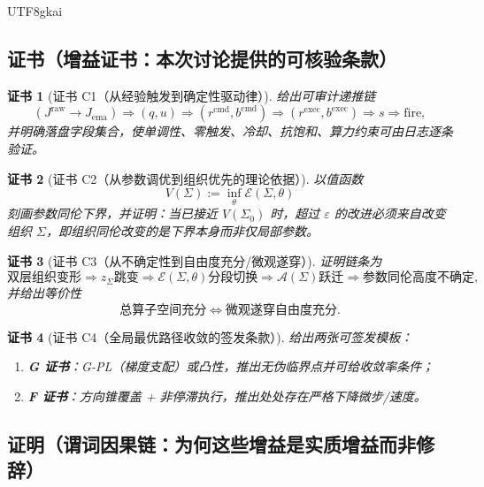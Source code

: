 \documentclass[12pt]{article}
\newtheorem{Certificate}{证书}[section]
\begin{document}
\begin{CJK*}{UTF8}{gkai}
\subsection{证书（增益证书：本次讨论提供的可核验条款）}
\label{subsec:tex28-ch13-certificates}

\begin{Certificate}[证书 C1（从经验触发到确定性驱动律）]
\label{cert:tex28-ch13-c1}
给出可审计递推链
\[
  (J^{\mathrm{raw}}\to J_{\mathrm{ema}})
  \Rightarrow
  (q,u)
  \Rightarrow
  (r^{\mathrm{cmd}},b^{\mathrm{cmd}})
  \Rightarrow
  (r^{\mathrm{exec}},b^{\mathrm{exec}})
  \Rightarrow
  s
  \Rightarrow
  \mathrm{fire},
\]
并明确落盘字段集合，使单调性、零触发、冷却、抗饱和、算力约束可由日志逐条验证。
\end{Certificate}

\begin{Certificate}[证书 C2（从参数调优到组织优先的理论依据）]
\label{cert:tex28-ch13-c2}
以值函数
\[
  V(\Sigma):=\inf_{\theta}\mathcal{E}(\Sigma,\theta)
\]
刻画参数同伦下界，并证明：当已接近 $V(\Sigma_0)$ 时，超过 $\varepsilon$ 的改进必须来自改变组织 $\Sigma$，即组织同伦改变的是下界本身而非仅局部参数。
\end{Certificate}

\begin{Certificate}[证书 C3（从不确定性到自由度充分/微观遂穿）]
\label{cert:tex28-ch13-c3}
证明链条为
\[
  \text{双层组织变形}
  \Rightarrow
  z_{\Sigma}\text{跳变}
  \Rightarrow
  \mathcal{E}(\Sigma,\theta)\text{分段切换}
  \Rightarrow
  \mathcal{A}(\Sigma)\text{跃迁}
  \Rightarrow
  \text{参数同伦高度不确定},
\]
并给出等价性
\[
  \text{总算子空间充分}
  \Longleftrightarrow
  \text{微观遂穿自由度充分}.
\]
\end{Certificate}

\begin{Certificate}[证书 C4（全局最优路径收敛的签发条款）]
\label{cert:tex28-ch13-c4}
给出两张可签发模板：
\begin{enumerate}
  \item \textbf{G 证书}：G-PL（梯度支配）或凸性，推出无伪临界点并可给收敛率条件；
  \item \textbf{F 证书}：方向锥覆盖 + 非停滞执行，推出处处存在严格下降微步/速度。
\end{enumerate}
\end{Certificate}

\subsection{证明（谓词因果链：为何这些增益是实质增益而非修辞）}
\label{subsec:tex28-ch13-proof}


\end{CJK*}
\end{document}
